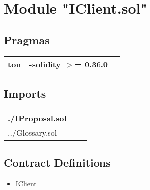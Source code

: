 
\section{Module "IClient.sol"}


\subsection{Pragmas}


\noindent\begin{tabular}{|l|l|p{5cm}|}\hline
ton & -solidity $>$= 0.36.0 &\\\hline
\end{tabular}


\subsection{Imports}


\noindent\begin{tabular}{|l|l|p{5cm}|}\hline
./IProposal.sol &\\\hline
../Glossary.sol &\\\hline
\end{tabular}


\subsection{Contract Definitions}

\begin{itemize}
\item IClient
\end{itemize}

